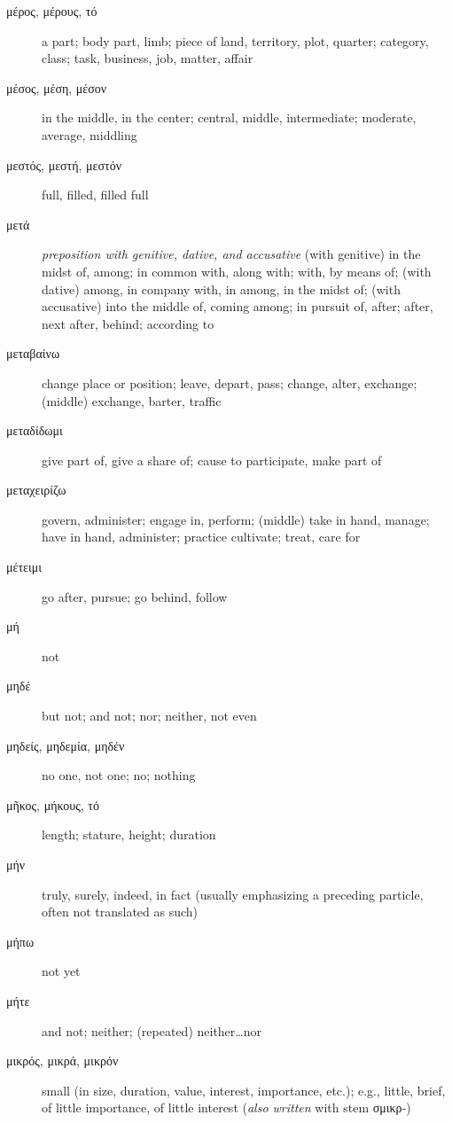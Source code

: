 \documentclass[12pt,letterpaper]{article}
\begin{document}
\begin{description}
    \item[\textgreek{μέρος, μέρους, τό}] \marginnote{*}a part; body part, limb; piece of land, territory, plot, quarter; category, class; task, business, job, matter, affair
    \item[\textgreek{μέσος, μέση, μέσον}] \marginnote{*}in the middle, in the center; central, middle, intermediate; moderate, average, middling
    \item[\textgreek{μεστός, μεστή, μεστόν}] full, filled, filled full
    \item[\textgreek{μετά}] \marginnote{*}\textit{preposition with genitive, dative, and accusative} (with genitive) in the midst of, among; in common with, along with; with, by means of; (with dative) among, in company with, in among, in the midst of; (with accusative) into the middle of, coming among; in pursuit of, after; after, next after, behind; according to
    \item[\textgreek{μεταβαίνω}] change place or position; leave, depart, pass; change, alter, exchange; (middle) exchange, barter, traffic
    \item[\textgreek{μεταδίδωμι}] give part of, give a share of; cause to participate, make part of
    \item[\textgreek{μεταχειρίζω}] govern, administer; engage in, perform; (middle) take in hand, manage; have in hand, administer; practice cultivate; treat, care for
    \item[\textgreek{μέτειμι}] go after, pursue; go behind, follow
    \item[\textgreek{μή}] \marginnote{*}not
    \item[\textgreek{μηδέ}] \marginnote{*}but not; and not; nor; neither, not even
    \item[\textgreek{μηδείς, μηδεμία, μηδέν}] \marginnote{*}no one, not one; no; nothing
    \item[\textgreek{μῆκος, μήκους, τό}] length; stature, height; duration
    \item[\textgreek{μήν}] \marginnote{*}truly, surely, indeed, in fact (usually emphasizing a preceding particle, often not translated as such)
    \item[\textgreek{μήπω}] not yet
    \item[\textgreek{μήτε}] \marginnote{*}and not; neither; (repeated) neither\dots nor
    \item[\textgreek{μικρός, μικρά, μικρόν}] \marginnote{*} small (in size, duration, value, interest, importance, etc.); e.g., little, brief, of little importance, of little interest (\textit{also written} with stem \textgreek{σμικρ}-)

\end{description}
\end{document}
